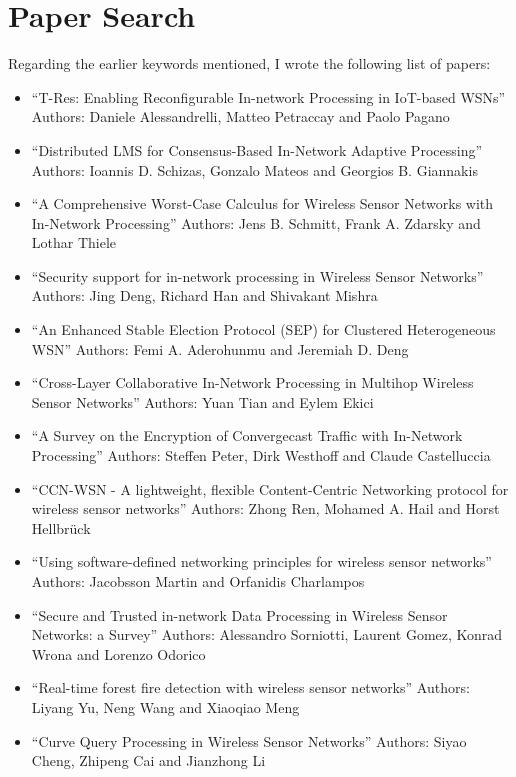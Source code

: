 \section{Paper Search}


Regarding the earlier keywords mentioned, I wrote the following list of papers:

\begin{itemize}
    \item “T-Res: Enabling Reconfigurable In-network Processing in IoT-based WSNs” Authors: Daniele Alessandrelli, Matteo Petraccay and Paolo Pagano
    \item “Distributed LMS for Consensus-Based In-Network Adaptive Processing” Authors: Ioannis D. Schizas, Gonzalo Mateos and Georgios B. Giannakis
    \item “A Comprehensive Worst-Case Calculus for Wireless Sensor Networks with In-Network Processing” Authors: Jens B. Schmitt, Frank A. Zdarsky and Lothar Thiele
    \item “Security support for in-network processing in Wireless Sensor Networks” Authors: Jing Deng, Richard Han and Shivakant Mishra
    \item “An Enhanced Stable Election Protocol (SEP) for Clustered Heterogeneous WSN” Authors: Femi A. Aderohunmu and Jeremiah D. Deng
    \item “Cross-Layer Collaborative In-Network Processing in Multihop Wireless Sensor Networks” Authors: Yuan Tian and Eylem Ekici
    \item “A Survey on the Encryption of Convergecast Traffic with In-Network Processing” Authors: Steffen Peter, Dirk Westhoff and Claude Castelluccia
    \item “CCN-WSN - A lightweight, flexible Content-Centric Networking protocol for wireless sensor networks” Authors: Zhong Ren, Mohamed A. Hail and Horst Hellbrück
    \item “Using software-defined networking principles for wireless sensor networks” Authors: Jacobsson Martin and Orfanidis Charlampos
    \item “Secure and Trusted in-network Data Processing in Wireless Sensor Networks: a Survey” Authors: Alessandro Sorniotti, Laurent Gomez, Konrad Wrona and Lorenzo Odorico
    \item “Real-time forest fire detection with wireless sensor networks” Authors: Liyang Yu, Neng Wang and Xiaoqiao Meng
    \item “Curve Query Processing in Wireless Sensor Networks” Authors: Siyao Cheng, Zhipeng Cai and Jianzhong Li

\end{itemize}
